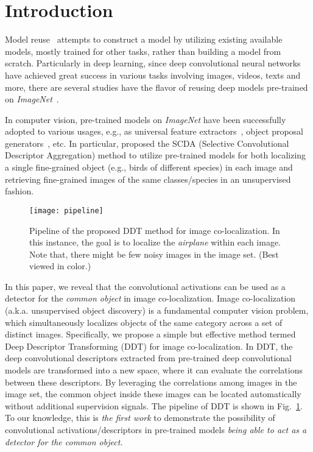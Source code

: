 \documentclass[twocolumn]{svjour3}          \smartqed  \usepackage{graphicx}
\begin{document}
\section{Introduction}

Model reuse~\citep{learnware} attempts to construct a model by utilizing existing available models, mostly trained for other tasks, rather than building a model from scratch. Particularly in deep learning, since deep convolutional neural networks have achieved great success in various tasks involving images, videos, texts and more, there are several studies have the flavor of reusing deep models pre-trained on \emph{ImageNet}~\citep{russaijcv2015}.

In computer vision, pre-trained models on \emph{ImageNet} have been successfully adopted to various usages, e.g., as universal feature extractors~\citep{majiijcv2016,wangiccv2015, yaoeccv2016}, object proposal generators~\citep{Amir15ICCV}, etc. In particular, \citet{scda2016} proposed the SCDA (Selective Convolutional Descriptor Aggregation) method to utilize pre-trained models for both localizing a single fine-grained object (e.g., birds of different species) in each image and retrieving fine-grained images of the same classes/species in an unsupervised fashion. 

\begin{figure}[t]
 \centering
 \texttt{[image: pipeline]}
 \caption{Pipeline of the proposed DDT method for image co-localization. In this instance, the goal is to localize the \emph{airplane} within each image. Note that, there might be few noisy images in the image set. (Best viewed in color.)}
 \label{fig:pipeline}
\end{figure}

In this paper, we reveal that the convolutional activations can be used as a detector for the \emph{common object} in image co-localization. Image co-localization (a.k.a. unsupervised object discovery) is a fundamental computer vision problem, which simultaneously localizes objects of the same category across a set of distinct images. Specifically, we propose a simple but effective method termed Deep Descriptor Transforming (DDT) for image co-localization. In DDT, the deep convolutional descriptors extracted from pre-trained deep convolutional models are transformed into a new space, where it can evaluate the correlations between these descriptors. By leveraging the correlations among images in the image set, the common object inside these images can be located automatically without additional supervision signals. The pipeline of DDT is shown in Fig.~\ref{fig:pipeline}. To our knowledge, this is \emph{the first work} to demonstrate the possibility of convolutional activations/descriptors in pre-trained models \emph{being able to act as a detector for the common object.}
\end{document}
